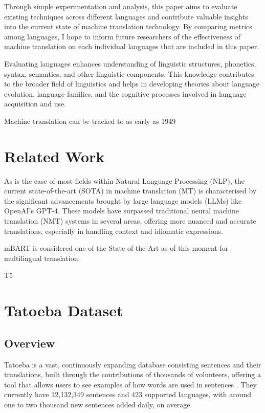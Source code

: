 \documentclass[a4paper]{article}
\begin{document}
Through simple experimentation and analysis, this paper aims to evaluate existing techniques across different languages
and contribute valuable insights into the current state of machine translation technology. By comparing metrics among languages, I hope to inform future researchers of the effectiveness of machine translation on each individual languages that are included in this paper.


Evaluating languages enhances understanding of linguistic structures, phonetics, syntax, semantics, and other linguistic components. This knowledge contributes to the broader field of linguistics and helps in developing theories about language evolution, language families, and the cognitive processes involved in language acquisition and use.

Machine translation can be tracked to as early as 1949 \cite{weaver-1999}

\section{Related Work}

As is the case of most fields within Natural Language Processing (NLP), the current state-of-the-art (SOTA) in machine translation (MT) is characterised by the significant advancements brought by large language models (LLMs) like OpenAI's GPT-4. These models have surpassed traditional neural machine translation (NMT) systems in several areas, offering more nuanced and accurate translations, especially in handling context and idiomatic expressions.

mBART \cite{liu-2020-mbart} is considered one of the State-of-the-Art as of this moment for multilingual translation.

T5 \cite{raffel-2023-t5}

\section{Tatoeba Dataset}

\subsection{Overview}

Tatoeba is a vast, continuously expanding database consisting sentences and their translations, built through the contributions of thousands of volunteers, offering a tool that allows users to see examples of how words are used in sentences \cite{tatoeba}. They currently have 12,132,349 sentences and 423 supported languages, with around one to two thousand new sentences added daily, on average
\end{document}
